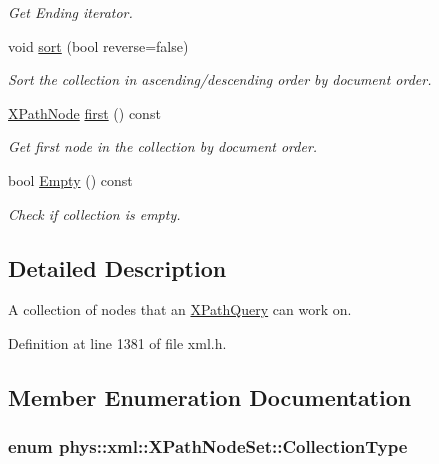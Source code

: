 \begin{DoxyCompactItemize}
\begin{DoxyCompactList}\small\item\em Get Ending iterator. \item\end{DoxyCompactList}\item 
void \hyperlink{classphys_1_1xml_1_1XPathNodeSet_a509bb7206dfc0fa79887c7ab7c5999db}{sort} (bool reverse=false)
\begin{DoxyCompactList}\small\item\em Sort the collection in ascending/descending order by document order. \item\end{DoxyCompactList}\item 
\hyperlink{classphys_1_1xml_1_1XPathNode}{XPathNode} \hyperlink{classphys_1_1xml_1_1XPathNodeSet_ae38baf21701ebbe42af3abfb6976d100}{first} () const 
\begin{DoxyCompactList}\small\item\em Get first node in the collection by document order. \item\end{DoxyCompactList}\item 
bool \hyperlink{classphys_1_1xml_1_1XPathNodeSet_a91fa85dbf474c51bc7a9df1baf38d43a}{Empty} () const 
\begin{DoxyCompactList}\small\item\em Check if collection is empty. \item\end{DoxyCompactList}\end{DoxyCompactItemize}


\subsection{Detailed Description}
A collection of nodes that an \hyperlink{classphys_1_1xml_1_1XPathQuery}{XPathQuery} can work on. 

Definition at line 1381 of file xml.h.



\subsection{Member Enumeration Documentation}
\hypertarget{classphys_1_1xml_1_1XPathNodeSet_ab178d39e119369702541033c067a995c}{
\subsubsection[{CollectionType}]{\setlength{\rightskip}{0pt plus 5cm}enum {\bf phys::xml::XPathNodeSet::CollectionType}}}
\label{de/dc2/classphys_1_1xml_1_1XPathNodeSet_ab178d39e119369702541033c067a995c}


